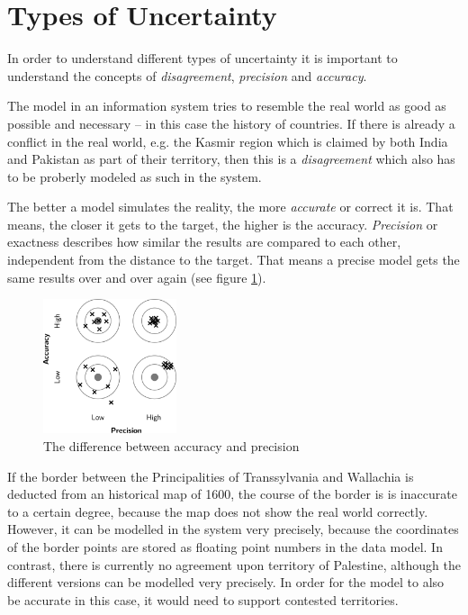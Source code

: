 


\section{Types of Uncertainty} %
\label{sec:types_of_uncertainty}

In order to understand different types of uncertainty it is important to understand the concepts of \emph{disagreement}, \emph{precision} and \emph{accuracy}.

The model in an information system tries to resemble the real world as good as possible and necessary -- in this case the history of countries. If there is already a conflict in the real world, e.g. the Kasmir region which is claimed by both India and Pakistan as part of their territory, then this is a \emph{disagreement} which also has to be proberly modeled as such in the system.

The better a model simulates the reality, the more \emph{accurate} or correct it is. That means, the closer it gets to the target, the higher is the accuracy. \emph{Precision} or exactness describes how similar the results are compared to each other, independent from the distance to the target. That means a precise model gets the same results over and over again (see figure \ref{fig:accuracy_precision}).

\begin{figure}[ht]
  \centering
  \includegraphics[width = 0.35\textwidth]{graphics/uncertainty/accuracy_precision}
  \caption{The difference between accuracy and precision}
  \label{fig:accuracy_precision}
\end{figure}

If the border between the Principalities of Transsylvania and Wallachia is deducted from an historical map of 1600, the course of the border is is inaccurate to a certain degree, because the map does not show the real world correctly. However, it can be modelled in the system very precisely, because the coordinates of the border points are stored as floating point numbers in the data model. In contrast, there is currently no agreement upon territory of Palestine, although the different versions can be modelled very precisely. In order for the model to also be accurate in this case, it would need to support contested territories.


